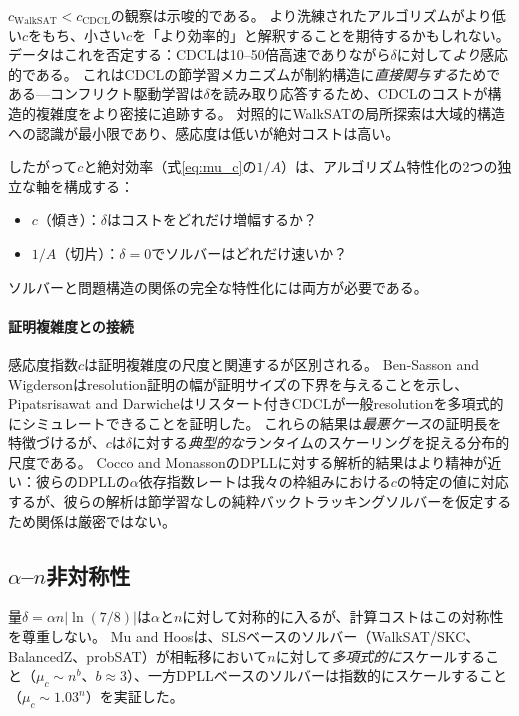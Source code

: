 \documentclass[11pt,a4paper]{article}
\begin{document}
$c_{\text{WalkSAT}} < c_{\text{CDCL}}$の観察は示唆的である。
より洗練されたアルゴリズムがより低い$c$をもち、小さい$c$を「より効率的」と解釈することを期待するかもしれない。
データはこれを否定する：CDCLは10--50倍高速でありながら$\delta$に対して\emph{より}感応的である。
これはCDCLの節学習メカニズムが制約構造に\emph{直接関与する}ためである---コンフリクト駆動学習は$\delta$を読み取り応答するため、CDCLのコストが構造的複雑度をより密接に追跡する。
対照的にWalkSATの局所探索は大域的構造への認識が最小限であり、感応度は低いが絶対コストは高い。

したがって$c$と絶対効率（式\ref{eq:mu_c}の$1/A$）は、アルゴリズム特性化の2つの独立な軸を構成する：
\begin{itemize}
\item $c$（傾き）：$\delta$はコストをどれだけ増幅するか？
\item $1/A$（切片）：$\delta = 0$でソルバーはどれだけ速いか？
\end{itemize}
ソルバーと問題構造の関係の完全な特性化には両方が必要である。

\paragraph{証明複雑度との接続}
感応度指数$c$は証明複雑度の尺度と関連するが区別される。
Ben-Sasson and Wigderson\cite{BenSasson2001}はresolution証明の幅が証明サイズの下界を与えることを示し、Pipatsrisawat and Darwiche\cite{Pipatsrisawat2011}はリスタート付きCDCLが一般resolutionを多項式的にシミュレートできることを証明した。
これらの結果は\emph{最悪ケース}の証明長を特徴づけるが、$c$は$\delta$に対する\emph{典型的な}ランタイムのスケーリングを捉える分布的尺度である。
Cocco and Monasson\cite{CoccoMonasson2001}のDPLLに対する解析的結果はより精神が近い：彼らのDPLLの$\alpha$依存指数レートは我々の枠組みにおける$c$の特定の値に対応するが、彼らの解析は節学習なしの純粋バックトラッキングソルバーを仮定するため関係は厳密ではない。

\subsection{$\alpha$--$n$非対称性}
\label{sec:asymmetry}

量$\delta = \alpha n |\!\ln(7/8)|$は$\alpha$と$n$に対して対称的に入るが、計算コストはこの対称性を尊重しない。
Mu and Hoos\cite{MuHoos2015}は、SLSベースのソルバー（WalkSAT/SKC、BalancedZ、probSAT）が相転移において$n$に対して\emph{多項式的に}スケールすること（$\mu_c \sim n^b$、$b \approx 3$）、一方DPLLベースのソルバーは指数的にスケールすること（$\mu_c \sim 1.03^n$）を実証した。
\end{document}
